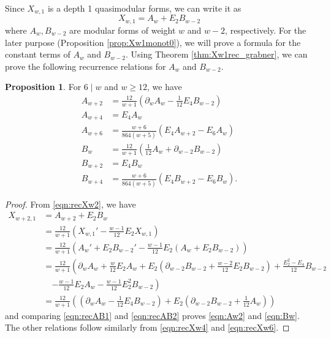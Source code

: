 \documentclass[10pt,reqno]{amsproc}
\newcommand{\1}{\mathds{1}}	%
\theoremstyle{definition}
\newtheorem{proposition}[theorem]{Proposition}
\theoremstyle{remark}
\begin{document}
Since $X_{w, 1}$ is a depth 1 quasimodular forms, we can write it as
\begin{equation}
    \label{eqn:Xw1AB}
    X_{w, 1} = A_{w} + E_2 B_{w-2}
\end{equation}
where $A_{w}, B_{w-2}$ are modular forms of weight $w$ and $w-2$, respectively.
For the later purpose (Proposition \ref{prop:Xw1monot0}), we will prove a formula for the constant terms of $A_w$ and $B_{w-2}$.
Using Theorem \ref{thm:Xw1rec_grabner}, we can prove the following recurrence relations for $A_w$ and $B_{w-2}$.

\begin{proposition}
    \label{prop:AwBwm2rec}
    For $6 \mid w$ and $w \ge 12$, we have
    \begin{align}
        A_{w+2} &= \frac{12}{w+1} \left(\partial_w A_w - \frac{1}{12} E_4 B_{w-2}\right) \label{eqn:Aw2} \\
        A_{w+4} &= E_4 A_w \label{eqn:Aw4} \\
        A_{w+6} &= \frac{w+6}{864(w+5)} (E_4 A_{w+2} - E_6 A_{w}) \label{eqn:Aw6} \\
        B_{w} &= \frac{12}{w+1} \left(\frac{1}{12} A_w + \partial_{w-2} B_{w-2}\right) \label{eqn:Bw} \\
        B_{w+2} &= E_4 B_{w} \label{eqn:Bw2} \\
        B_{w+4} &= \frac{w+6}{864(w+5)} (E_4 B_{w+2} - E_6 B_{w}). \label{eqn:Bw4}
    \end{align}
\end{proposition}
\begin{proof}
    From \eqref{eqn:recXw2}, we have
    \begin{align}
        X_{w+2, 1} &= A_{w+2} + E_2 B_{w} \label{eqn:recAB1} \\
        &= \frac{12}{w+1} \left(X_{w, 1}' - \frac{w-1}{12} E_2 X_{w, 1}\right) \nonumber \\
        &= \frac{12}{w+1} \left(A_w' + E_2 B_{w-2}' - \frac{w-1}{12} E_2 (A_w + E_2 B_{w-2})\right) \nonumber \\
        &= \frac{12}{w+1} \left(\partial_w A_w + \frac{w}{12} E_2 A_w + E_2 \left(\partial_{w-2} B_{w-2} + \frac{w-2}{12} E_2 B_{w-2}\right) + \frac{E_2^2 - E_4}{12} B_{w-2} \right. \nonumber \\
        &\quad\left.- \frac{w-1}{12} E_2 A_w - \frac{w-1}{12} E_2^2 B_{w-2}\right) \nonumber \\
        &= \frac{12}{w+1} \left(\left(\partial_w A_w - \frac{1}{12} E_4 B_{w-2}\right) + E_2 \left(\partial_{w-2} B_{w-2} + \frac{1}{12} A_w\right)\right) \label{eqn:recAB2}
    \end{align}
    and comparing \eqref{eqn:recAB1} and \eqref{eqn:recAB2} proves \eqref{eqn:Aw2} and \eqref{eqn:Bw}.
    The other relations follow similarly from \eqref{eqn:recXw4} and \eqref{eqn:recXw6}.
\end{proof}
\end{document}
